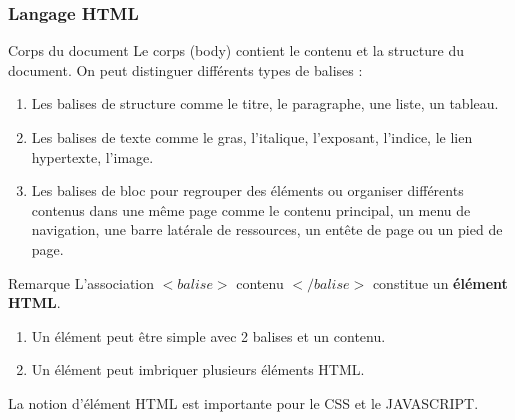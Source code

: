 \documentclass[8pt]{beamer}
\newcounter{num}
\begin{document}
\begin{frame}
\frametitle{Langage HTML}

\begin{block}{Corps du document}
Le corps (body) contient le contenu et la structure du document. On peut distinguer différents types de balises :
\begin{enumerate}
\item Les balises de structure comme le titre, le paragraphe, une liste, un tableau.
\item Les balises de texte comme le gras, l'italique, l'exposant, l'indice, le lien hypertexte, l'image.
\item Les balises de bloc pour regrouper des éléments ou organiser différents contenus dans une même page comme le contenu principal, un menu de navigation, une barre latérale de ressources, un entête de page ou un pied de page.
\end{enumerate}
\end{block}

\begin{alertblock}{Remarque}
L'association $<balise>$ contenu $</balise>$ constitue un \textbf{élément HTML}.
\begin{enumerate}
\item Un élément peut être simple avec 2 balises et un contenu.
\item Un élément peut imbriquer plusieurs éléments HTML.
\end{enumerate}
La notion d'élément HTML est importante pour le CSS et le JAVASCRIPT.
\end{alertblock}
\end{frame}
\end{document}
